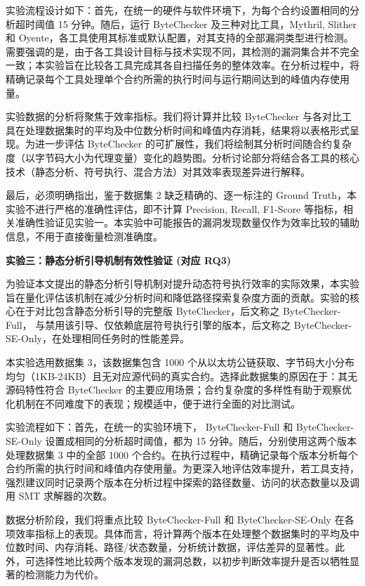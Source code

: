 \documentclass[print, master, vlined, timesmath]{DissertUESTC}
\begin{document}
实验流程设计如下：首先，在统一的硬件与软件环境下，为每个合约设置相同的分析超时阈值 15 分钟。随后，运行 ByteChecker 及三种对比工具，Mythril, Slither 和 Oyente，各工具使用其标准或默认配置，对其支持的全部漏洞类型进行检测。需要强调的是，由于各工具设计目标与技术实现不同，其检测的漏洞集合并不完全一致；本实验旨在比较各工具完成其各自扫描任务的整体效率。在分析过程中，将精确记录每个工具处理单个合约所需的执行时间与运行期间达到的峰值内存使用量。

实验数据的分析将聚焦于效率指标。我们将计算并比较 ByteChecker 与各对比工具在处理数据集时的平均及中位数分析时间和峰值内存消耗，结果将以表格形式呈现。为进一步评估 ByteChecker 的可扩展性，我们将绘制其分析时间随合约复杂度（以字节码大小为代理变量）变化的趋势图。分析讨论部分将结合各工具的核心技术（静态分析、符号执行、混合方法）对其效率表现差异进行解释。

最后，必须明确指出，鉴于数据集 2 缺乏精确的、逐一标注的 Ground Truth，本实验不进行严格的准确性评估，即不计算 Precision, Recall, F1-Score 等指标，相关准确性验证见实验一。本实验中可能报告的漏洞发现数量仅作为效率比较的辅助信息，不用于直接衡量检测准确度。

\textbf{实验三：静态分析引导机制有效性验证 (对应 RQ3)}

为验证本文提出的静态分析引导机制对提升动态符号执行效率的实际效果，本实验旨在量化评估该机制在减少分析时间和降低路径探索复杂度方面的贡献。实验的核心在于对比包含静态分析引导的完整版 ByteChecker，后文称之 ByteChecker-Full， 与禁用该引导、仅依赖底层符号执行引擎的版本，后文称之 ByteChecker-SE-Only，在处理相同任务时的性能差异。

本实验选用数据集 3，该数据集包含 1000 个从以太坊公链获取、字节码大小分布均匀（1KB-24KB）且无对应源代码的真实合约。选择此数据集的原因在于：其无源码特性符合 ByteChecker 的主要应用场景；合约复杂度的多样性有助于观察优化机制在不同难度下的表现；规模适中，便于进行全面的对比测试。

实验流程如下：首先，在统一的实验环境下， ByteChecker-Full 和 ByteChecker-SE-Only 设置成相同的分析超时阈值，都为  15 分钟。随后，分别使用这两个版本处理数据集 3 中的全部 1000 个合约。在执行过程中，精确记录每个版本分析每个合约所需的执行时间和峰值内存使用量。为更深入地评估效率提升，若工具支持，强烈建议同时记录两个版本在分析过程中探索的路径数量、访问的状态数量以及调用 SMT 求解器的次数。

数据分析阶段，我们将重点比较 ByteChecker-Full 和 ByteChecker-SE-Only 在各项效率指标上的表现。具体而言，将计算两个版本在处理整个数据集时的平均及中位数时间、内存消耗、路径/状态数量，分析统计数据，评估差异的显著性。此外，可选择性地比较两个版本发现的漏洞总数，以初步判断效率提升是否以牺牲显著的检测能力为代价。
\end{document}
